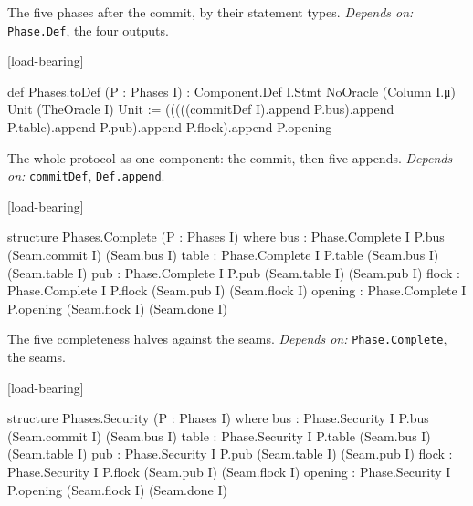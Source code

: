
The five phases after the commit, by their statement types. \emph{Depends on:} \texttt{Phase.\allowbreak{}Def}, the four outputs.

\par\medskip\noindent\textbf{}\hfill\textsf{\small [load-bearing]}\par\nopagebreak

\begin{leancode}
def Phases.toDef (P : Phases I) :
    Component.Def I.Stmt NoOracle (Column I.μ) Unit (TheOracle I) Unit :=
  (((((commitDef I).append P.bus).append P.table).append P.pub).append P.flock).append P.opening
\end{leancode}


The whole protocol as one component: the commit, then five appends. \emph{Depends on:} \texttt{commitDef}, \texttt{Def.\allowbreak{}append}.

\par\medskip\noindent\textbf{}\hfill\textsf{\small [load-bearing]}\par\nopagebreak

\begin{leancode}
structure Phases.Complete (P : Phases I) where
  bus : Phase.Complete I P.bus (Seam.commit I) (Seam.bus I)
  table : Phase.Complete I P.table (Seam.bus I) (Seam.table I)
  pub : Phase.Complete I P.pub (Seam.table I) (Seam.pub I)
  flock : Phase.Complete I P.flock (Seam.pub I) (Seam.flock I)
  opening : Phase.Complete I P.opening (Seam.flock I) (Seam.done I)
\end{leancode}


The five completeness halves against the seams. \emph{Depends on:} \texttt{Phase.\allowbreak{}Complete}, the seams.

\par\medskip\noindent\textbf{}\hfill\textsf{\small [load-bearing]}\par\nopagebreak

\begin{leancode}
structure Phases.Security (P : Phases I) where
  bus : Phase.Security I P.bus (Seam.commit I) (Seam.bus I)
  table : Phase.Security I P.table (Seam.bus I) (Seam.table I)
  pub : Phase.Security I P.pub (Seam.table I) (Seam.pub I)
  flock : Phase.Security I P.flock (Seam.pub I) (Seam.flock I)
  opening : Phase.Security I P.opening (Seam.flock I) (Seam.done I)
\end{leancode}

